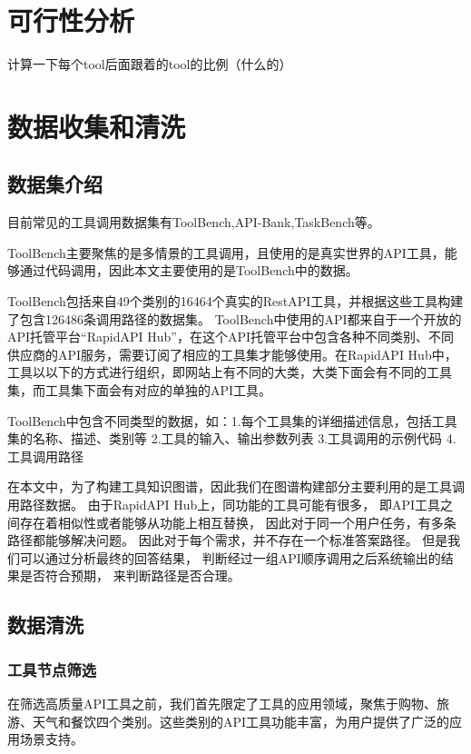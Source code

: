 \section{可行性分析}

计算一下每个tool后面跟着的tool的比例（什么的）

\section{数据收集和清洗}

\subsection{数据集介绍}

目前常见的工具调用数据集有ToolBench\cite{Qin2023},API-Bank\cite{Li2023c},TaskBench\cite{shen2023taskbench}等。

ToolBench主要聚焦的是多情景的工具调用，且使用的是真实世界的API工具，能够通过代码调用，因此本文主要使用的是ToolBench中的数据。

ToolBench包括来自49个类别的16464个真实的RestAPI工具，并根据这些工具构建了包含126486条调用路径的数据集。
ToolBench中使用的API都来自于一个开放的API托管平台“RapidAPI Hub”，在这个API托管平台中包含各种不同类别、不同供应商的API服务，需要订阅了相应的工具集才能够使用。在RapidAPI Hub中，工具以以下的方式进行组织，即网站上有不同的大类，大类下面会有不同的工具集，而工具集下面会有对应的单独的API工具。

ToolBench中包含不同类型的数据，如：1.每个工具集的详细描述信息，包括工具集的名称、描述、类别等 2.工具的输入、输出参数列表 3.工具调用的示例代码 4.工具调用路径

在本文中，为了构建工具知识图谱，因此我们在图谱构建部分主要利用的是工具调用路径数据。
由于RapidAPI Hub上，同功能的工具可能有很多，
即API工具之间存在着相似性或者能够从功能上相互替换，
因此对于同一个用户任务，有多条路径都能够解决问题。
因此对于每个需求，并不存在一个标准答案路径。
但是我们可以通过分析最终的回答结果，
判断经过一组API顺序调用之后系统输出的结果是否符合预期，
来判断路径是否合理。

\subsection{数据清洗}

\subsubsection{工具节点筛选}

在筛选高质量API工具之前，我们首先限定了工具的应用领域，聚焦于购物、旅游、天气和餐饮四个类别。这些类别的API工具功能丰富，为用户提供了广泛的应用场景支持。

